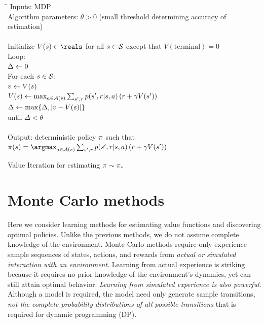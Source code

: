 \begin{table}
\begin{tabbing}
\hspace*{1cm}\=\hspace*{1cm}\=\hspace*{1cm}\=\hspace*{1cm}\=
\hspace*{1cm}\=\hspace*{1cm}\=\hspace*{1cm}\=\hspace*{1cm}\= \kill
\>Inputs: MDP \\
\>Algorithm parameters: $\theta > 0$ (small threshold determining accuracy of estimation)\\
\\
\>Initialize $V(\curs) \in \reals$ for all $s \in \mathcal{S}$ except that $V(\mathrm{terminal}) = 0$ \\
\> Loop: \\
\> \> $\Delta \leftarrow 0$ \\
\> \> For each $s\in\mathcal{S}$: \\
\> \> \> $v\leftarrow V(s)$ \\
\> \> \> $V(s) \leftarrow \max_{a\in\mathcal{A}(s)} \sum_{{s'}, r} p({s'}, r|s,a) \left( r + \gamma V({s'}) \right)$ \\
\> \> \> $\Delta \leftarrow \max\{\Delta, |v-V(s)|\}$ \\
\> until $\Delta < \theta$\\
\\
\> Output: deterministic policy $\pi$ such that\\
\> \> $\pol(\curs) = \argmax_{\cura\in\actionset(\curs)} \sum_{\nexts, r} p(\nexts, r|\curs,\cura) \left( r + \df V(\nexts) \right)$
\end{tabbing}
\caption{Value Iteration for estimating $\pi \sim {\ensuremath{\pi}}_\ast$}
\label{tab:alg:value-iteration}
\end{table}



\newpage
\section{Monte Carlo methods}

Here we consider learning methods for estimating value functions and discovering optimal policies.
Unlike the previous methods,
we do not assume complete knowledge of the environment.
Monte Carlo methods require only experience sample sequences of states, actions, and rewards
from \emph{actual or simulated interaction with an environment}.
Learning from actual experience is striking because it requires no prior knowledge of the environment’s dynamics,
yet can still attain optimal behavior.
\emph{Learning from simulated experience is also powerful.}
Although a model is required,
the model need only generate sample transitions,
\emph{not the complete probability distributions of all possible transitions} that is required for dynamic programming (DP).


